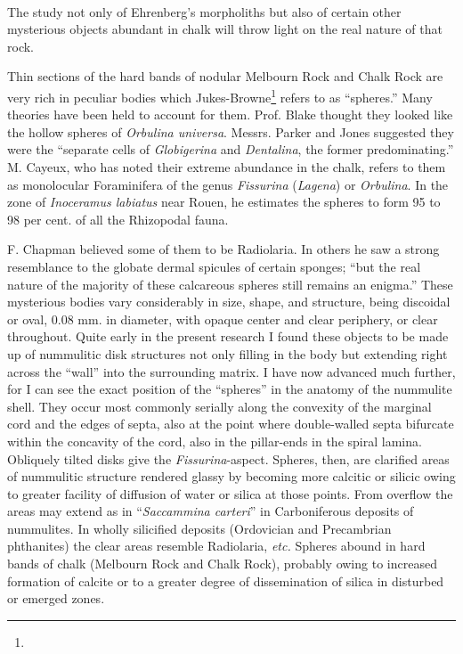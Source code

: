 \documentclass[a4paper, 12pt, oneside]{article}
\begin{document}
\paragraph{}
The study not only of Ehrenberg's morpholiths but also of certain other mysterious objects abundant in chalk will throw light on the real nature of that rock.

Thin sections of the hard bands of nodular Melbourn Rock and Chalk Rock are very rich in peculiar bodies which Jukes-Browne\footnote{} refers to as ``spheres.'' Many theories have been held to account for them. Prof. Blake thought they looked like the hollow spheres of \emph{Orbulina universa}. Messrs. Parker and Jones suggested they were the ``separate cells of \emph{Globigerina} and \emph{Dentalina}, the former predominating.'' M. Cayeux, who has noted their extreme abundance in the chalk, refers to them as monolocular Foraminifera of the genus \emph{Fissurina} (\emph{Lagena}) or \emph{Orbulina}. In the zone of \emph{Inoceramus labiatus} near Rouen, he estimates the spheres to form 95 to 98 per cent. of all the Rhizopodal fauna.

F. Chapman believed some of them to be Radiolaria. In others he saw a strong resemblance to the globate dermal spicules of certain sponges; ``but the real nature of the majority of these calcareous spheres still remains an enigma.'' These mysterious bodies vary considerably in size, shape, and structure, being discoidal or oval, 0.08 mm. in diameter, with opaque center and clear periphery, or clear throughout. Quite early in the present research I found these objects to be made up of nummulitic disk structures not only filling in the body but extending right across the ``wall'' into the surrounding matrix. I have now advanced much further, for I can see the exact position of the ``spheres'' in the anatomy of the nummulite shell. They occur most commonly serially along the convexity of the marginal cord and the edges of septa, also at the point where double-walled septa bifurcate within the concavity of the cord, also in the pillar-ends in the spiral lamina. Obliquely tilted disks give the \emph{Fissurina}-aspect. Spheres, then, are clarified areas of nummulitic structure rendered glassy by becoming more calcitic or silicic owing to greater facility of diffusion of water or silica at those points. From overflow the areas may extend as in ``\emph{Saccammina carteri}'' in Carboniferous deposits of nummulites. In wholly silicified deposits (Ordovician and Precambrian phthanites) the clear areas resemble Radiolaria, \emph{etc.} Spheres abound in hard bands of chalk (Melbourn Rock and Chalk Rock), probably owing to increased formation of calcite or to a greater degree of dissemination of silica in disturbed or emerged zones.
\end{document}
